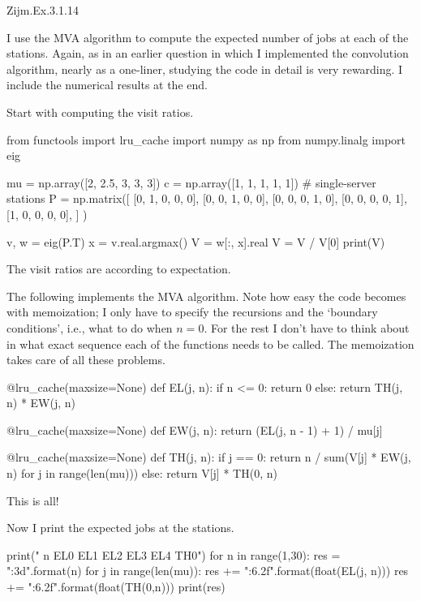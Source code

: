 \begin{exercise}
Zijm.Ex.3.1.14
\begin{solution}
  I use the MVA algorithm to compute the expected number of jobs at
  each of the stations. Again, as in an earlier question in which I
  implemented the convolution algorithm, nearly as a one-liner,
  studying the code in detail is very rewarding. I include the
  numerical results at the end.


 Start with computing the visit ratios.

\begin{pyconsole}
from functools import lru_cache
import numpy as np
from numpy.linalg import eig

mu = np.array([2, 2.5, 3, 3, 3])
c = np.array([1, 1, 1, 1, 1])  # single-server stations
P = np.matrix([
    [0, 1, 0, 0, 0],
    [0, 0, 1, 0, 0],
    [0, 0, 0, 1, 0],
    [0, 0, 0, 0, 1],
    [1, 0, 0, 0, 0],
]
)

v, w = eig(P.T)
x = v.real.argmax()
V = w[:, x].real
V = V / V[0]
print(V)
  
\end{pyconsole}
The visit ratios are according to expectation.


The following implements the MVA algorithm. Note how easy the code becomes with
memoization; I only have to specify the recursions and the `boundary
conditions', i.e., what to do when $n=0$. For the rest I don't have to
think about in what exact sequence each of the functions needs to be
called. The memoization takes care of all these problems.

\begin{pyconsole}
@lru_cache(maxsize=None)
def EL(j, n):
    if n <= 0:
        return 0
    else:
        return TH(j, n) * EW(j, n)


@lru_cache(maxsize=None)
def EW(j, n):
    return (EL(j, n - 1) + 1) / mu[j]


@lru_cache(maxsize=None)
def TH(j, n):
    if j == 0:
        return n / sum(V[j] * EW(j, n) for j in range(len(mu)))
    else:
        return V[j] * TH(0, n)
  
\end{pyconsole}
This is all!


Now I print the expected jobs at the stations. 

\begin{pyconsole}
print("  n   EL0   EL1   EL2  EL3   EL4   TH0")
for n in range(1,30):
    res = "{:3d}".format(n)
    for j in range(len(mu)):
        res += "{:6.2f}".format(float(EL(j, n)))
    res += "{:6.2f}".format(float(TH(0,n)))
    print(res)
  

\end{pyconsole}
\end{solution}
\end{exercise}
